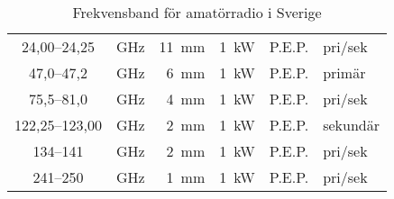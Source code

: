 \begin{table*}[ht]
\begin{tabular}{clr|rl|l}
24,00--24,25 & GHz & 11~mm & 1~kW & P.E.P. & pri/sek\\ 
47,0--47,2 & GHz & 6~mm & 1~kW & P.E.P. & primär\\ 
75,5--81,0 & GHz & 4~mm & 1~kW & P.E.P. & pri/sek\\ 
122,25--123,00 & GHz & 2~mm & 1~kW & P.E.P. & sekundär\\ 
134--141 & GHz & 2~mm & 1~kW & P.E.P. & pri/sek\\ 
241--250 & GHz & 1~mm & 1~kW & P.E.P. & pri/sek\\ 
\end{tabular} 
\caption{Frekvensband för amatörradio i Sverige} 
\label{frekvensplan} 
\end{table*} 
